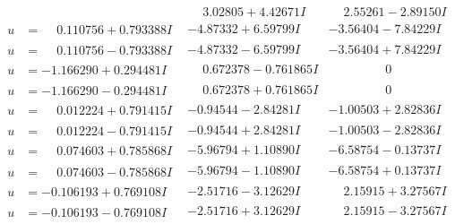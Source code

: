 \documentclass[1p]{elsarticle_modified}
\theoremstyle{definition}
\begin{document}
$$\begin{array}{c|c|c}
 & \phantom{-}3.02805 + 4.42671 I & \phantom{-}2.55261 - 2.89150 I \\ \hline\begin{aligned}
u &= \phantom{-}0.110756 + 0.793388 I\end{aligned}
 & -4.87332 + 6.59799 I & -3.56404 - 7.84229 I \\ \hline\begin{aligned}
u &= \phantom{-}0.110756 - 0.793388 I\end{aligned}
 & -4.87332 - 6.59799 I & -3.56404 + 7.84229 I \\ \hline\begin{aligned}
u &= -1.166290 + 0.294481 I\end{aligned}
 & \phantom{-}0.672378 - 0.761865 I & \phantom{-0.000000 } 0 \\ \hline\begin{aligned}
u &= -1.166290 - 0.294481 I\end{aligned}
 & \phantom{-}0.672378 + 0.761865 I & \phantom{-0.000000 } 0 \\ \hline\begin{aligned}
u &= \phantom{-}0.012224 + 0.791415 I\end{aligned}
 & -0.94544 - 2.84281 I & -1.00503 + 2.82836 I \\ \hline\begin{aligned}
u &= \phantom{-}0.012224 - 0.791415 I\end{aligned}
 & -0.94544 + 2.84281 I & -1.00503 - 2.82836 I \\ \hline\begin{aligned}
u &= \phantom{-}0.074603 + 0.785868 I\end{aligned}
 & -5.96794 + 1.10890 I & -6.58754 - 0.13737 I \\ \hline\begin{aligned}
u &= \phantom{-}0.074603 - 0.785868 I\end{aligned}
 & -5.96794 - 1.10890 I & -6.58754 + 0.13737 I \\ \hline\begin{aligned}
u &= -0.106193 + 0.769108 I\end{aligned}
 & -2.51716 - 3.12629 I & \phantom{-}2.15915 + 3.27567 I \\ \hline\begin{aligned}
u &= -0.106193 - 0.769108 I\end{aligned}
 & -2.51716 + 3.12629 I & \phantom{-}2.15915 - 3.27567 I \\ \hline\begin{aligned}

\end{aligned}
\end{array}$$
\end{document}
